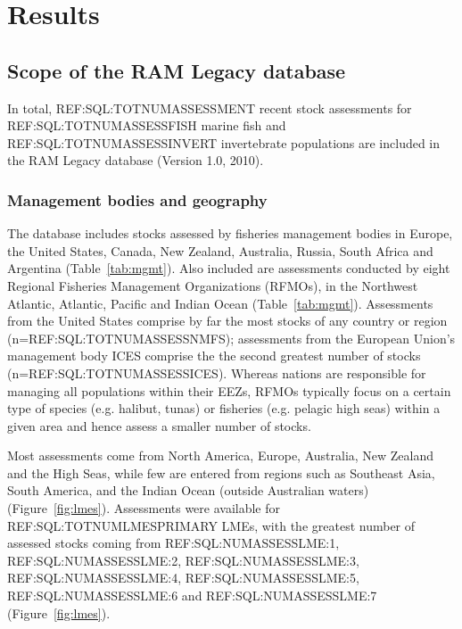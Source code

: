 \newpage
\section*{Results}
\subsection*{Scope of the RAM Legacy database}
In total, REF:SQL:TOTNUMASSESSMENT recent stock assessments for
REF:SQL:TOTNUMASSESSFISH marine fish and REF:SQL:TOTNUMASSESSINVERT
invertebrate populations are included in the RAM Legacy database
(Version 1.0, 2010).

\subsubsection*{Management bodies and geography}
The database includes stocks assessed by fisheries management bodies
in Europe, the United States, Canada, New Zealand, Australia, Russia,
South Africa and Argentina (Table~\ref{tab:mgmt}). Also included are assessments
conducted by eight Regional Fisheries Management Organizations
(RFMOs), in the Northwest Atlantic, Atlantic, Pacific and Indian Ocean
(Table~\ref{tab:mgmt}). Assessments from the United States comprise by far the most
stocks of any country or region (n=REF:SQL:TOTNUMASSESSNMFS);
assessments from the European Union's management body ICES comprise
the the second greatest number of stocks (n=REF:SQL:TOTNUMASSESSICES).
Whereas nations are responsible for managing all populations within
their EEZs, RFMOs typically focus on a certain type of species (e.g.
halibut, tunas) or fisheries (e.g. pelagic high seas) within a given
area and hence assess a smaller number of stocks.

Most assessments come from North America, Europe, Australia, New
Zealand and the High Seas, while few are entered from regions such as
Southeast Asia, South America, and the Indian Ocean (outside
Australian waters) (Figure~\ref{fig:lmes}). Assessments were available for REF:SQL:TOTNUMLMESPRIMARY LMEs, with the greatest number of
assessed stocks coming from REF:SQL:NUMASSESSLME:1,
REF:SQL:NUMASSESSLME:2, REF:SQL:NUMASSESSLME:3,
REF:SQL:NUMASSESSLME:4, REF:SQL:NUMASSESSLME:5, REF:SQL:NUMASSESSLME:6
and REF:SQL:NUMASSESSLME:7 (Figure~\ref{fig:lmes}).


